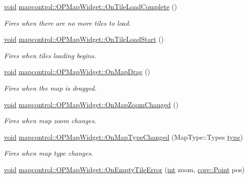\begin{DoxyCompactItemize}
\hyperlink{group___u_a_v_objects_plugin_ga444cf2ff3f0ecbe028adce838d373f5c}{void} \hyperlink{group___o_p_map_widget_ga5cffbc0b6973aa0d25c7a8e3cb9a10bd}{mapcontrol\-::\-O\-P\-Map\-Widget\-::\-On\-Tile\-Load\-Complete} ()
\begin{DoxyCompactList}\small\item\em Fires when there are no more tiles to load. \end{DoxyCompactList}\item 
\hyperlink{group___u_a_v_objects_plugin_ga444cf2ff3f0ecbe028adce838d373f5c}{void} \hyperlink{group___o_p_map_widget_gab28c7ce093c06e3dd06d7981fa34abde}{mapcontrol\-::\-O\-P\-Map\-Widget\-::\-On\-Tile\-Load\-Start} ()
\begin{DoxyCompactList}\small\item\em Fires when tiles loading begins. \end{DoxyCompactList}\item 
\hyperlink{group___u_a_v_objects_plugin_ga444cf2ff3f0ecbe028adce838d373f5c}{void} \hyperlink{group___o_p_map_widget_ga0985006355718a5c61bfd02c70e6b0aa}{mapcontrol\-::\-O\-P\-Map\-Widget\-::\-On\-Map\-Drag} ()
\begin{DoxyCompactList}\small\item\em Fires when the map is dragged. \end{DoxyCompactList}\item 
\hyperlink{group___u_a_v_objects_plugin_ga444cf2ff3f0ecbe028adce838d373f5c}{void} \hyperlink{group___o_p_map_widget_ga6cff965989ae7d23b98d5345c3912492}{mapcontrol\-::\-O\-P\-Map\-Widget\-::\-On\-Map\-Zoom\-Changed} ()
\begin{DoxyCompactList}\small\item\em Fires when map zoom changes. \end{DoxyCompactList}\item 
\hyperlink{group___u_a_v_objects_plugin_ga444cf2ff3f0ecbe028adce838d373f5c}{void} \hyperlink{group___o_p_map_widget_gad0bd8494b0fba444bad76bcf3c1bdb0a}{mapcontrol\-::\-O\-P\-Map\-Widget\-::\-On\-Map\-Type\-Changed} (Map\-Type\-::\-Types \hyperlink{glext_8h_a7d05960f4f1c1b11f3177dc963a45d86}{type})
\begin{DoxyCompactList}\small\item\em Fires when map type changes. \end{DoxyCompactList}\item 
\hyperlink{group___u_a_v_objects_plugin_ga444cf2ff3f0ecbe028adce838d373f5c}{void} \hyperlink{group___o_p_map_widget_gad393b8af8f879239faaa466bbc33f4b7}{mapcontrol\-::\-O\-P\-Map\-Widget\-::\-On\-Empty\-Tile\-Error} (\hyperlink{ioapi_8h_a787fa3cf048117ba7123753c1e74fcd6}{int} zoom, \hyperlink{structcore_1_1_point}{core\-::\-Point} pos)

\end{DoxyCompactItemize}

